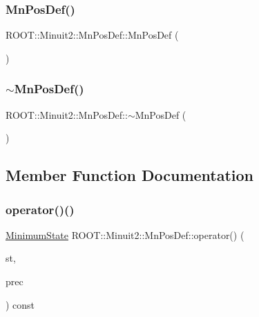 \subsubsection{\texorpdfstring{MnPosDef()}{MnPosDef()}\hspace{0.1cm}{\footnotesize\ttfamily [2/2]}}
{\footnotesize\ttfamily R\+O\+O\+T\+::\+Minuit2\+::\+Mn\+Pos\+Def\+::\+Mn\+Pos\+Def (\begin{DoxyParamCaption}{ }\end{DoxyParamCaption})\hspace{0.3cm}{\ttfamily [inline]}}

\mbox{\label{classROOT_1_1Minuit2_1_1MnPosDef_a1bc55c7ddd347c0f7834b7d64a62b964}} 
\subsubsection{\texorpdfstring{$\sim$MnPosDef()}{~MnPosDef()}\hspace{0.1cm}{\footnotesize\ttfamily [2/2]}}
{\footnotesize\ttfamily R\+O\+O\+T\+::\+Minuit2\+::\+Mn\+Pos\+Def\+::$\sim$\+Mn\+Pos\+Def (\begin{DoxyParamCaption}{ }\end{DoxyParamCaption})\hspace{0.3cm}{\ttfamily [inline]}}



\subsection{Member Function Documentation}
\mbox{\label{classROOT_1_1Minuit2_1_1MnPosDef_a5a550c841e9b62d3c09cdf9df61a88f4}} 
\subsubsection{\texorpdfstring{operator()()}{operator()()}\hspace{0.1cm}{\footnotesize\ttfamily [1/4]}}
{\footnotesize\ttfamily \mbox{\hyperlink{classROOT_1_1Minuit2_1_1MinimumState}{Minimum\+State}} R\+O\+O\+T\+::\+Minuit2\+::\+Mn\+Pos\+Def\+::operator() (\begin{DoxyParamCaption}\item[{const \mbox{\hyperlink{classROOT_1_1Minuit2_1_1MinimumState}{Minimum\+State}} \&}]{st,  }\item[{const \mbox{\hyperlink{classROOT_1_1Minuit2_1_1MnMachinePrecision}{Mn\+Machine\+Precision}} \&}]{prec }\end{DoxyParamCaption}) const}

